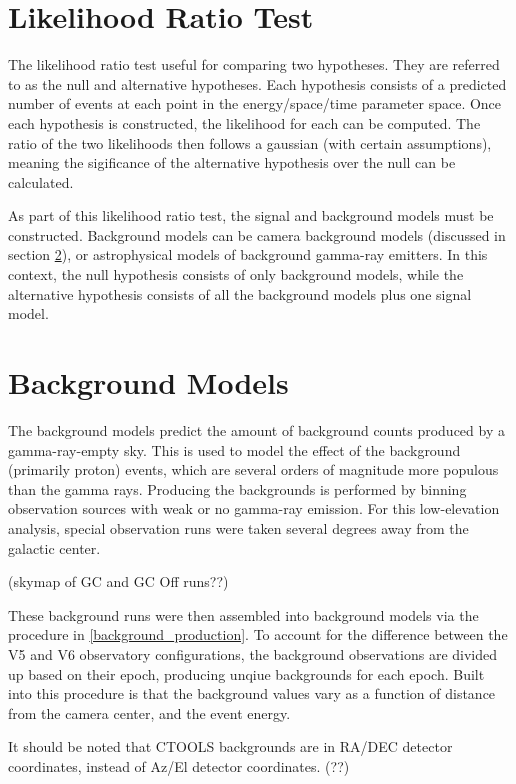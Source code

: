 \section{Likelihood Ratio Test}
  The likelihood ratio test useful for comparing two hypotheses.
  They are referred to as the null and alternative hypotheses.
  Each hypothesis consists of a predicted number of events at each point in the energy/space/time parameter space.
  Once each hypothesis is constructed, the likelihood for each can be computed.
  The ratio of the two likelihoods then follows a gaussian (with certain assumptions), meaning the sigificance of the alternative hypothesis over the null can be calculated.

  As part of this likelihood ratio test, the signal and background models must be constructed.
  Background models can be camera background models (discussed in section \ref{sec:bkgmodels}), or astrophysical models of background gamma-ray emitters.
  In this context, the null hypothesis consists of only background models, while the alternative hypothesis consists of all the background models plus one signal model.

\section{Background Models}\label{sec:bkgmodels}
  The background models predict the amount of background counts produced by a gamma-ray-empty sky.
  This is used to model the effect of the background (primarily proton) events, which are several orders of magnitude more populous than the gamma rays.
  Producing the backgrounds is performed by binning observation sources with weak or no gamma-ray emission.
  For this low-elevation analysis, special observation runs were taken several degrees away from the galactic center.

  (skymap of GC and GC Off runs??)

  These background runs were then assembled into background models via the procedure in \ref{background_production}.
  To account for the difference between the V5 and V6 observatory configurations, the background observations are divided up based on their epoch, producing unqiue backgrounds for each epoch.
  Built into this procedure is that the background values vary as a function of distance from the camera center, and the event energy.

  It should be noted that CTOOLS backgrounds are in RA/DEC detector coordinates, instead of Az/El detector coordinates. (??)

